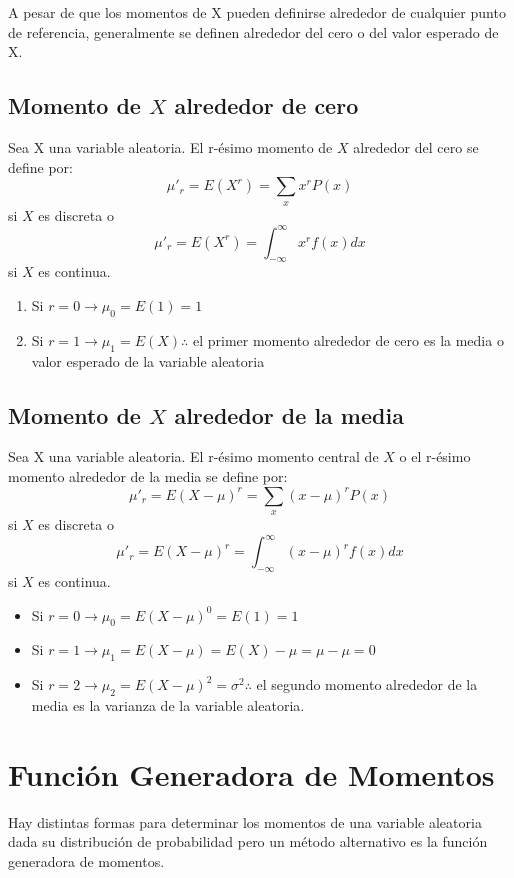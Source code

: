 \documentclass{book}
\begin{document}
A pesar de que los momentos de X pueden definirse alrededor de cualquier punto de referencia, generalmente se definen alrededor del cero o del valor esperado de X. 
 
\subsection{Momento de $X$ alrededor de cero} 
Sea X una variable aleatoria. El r-ésimo momento de $X$ alrededor del cero se define por:
$$\mu'_r = E(X^r)=\underset{x}{\sum}x^rP(x)$$ si $X$ es discreta o $$\mu'_r=E(X^r)=\int_{-\infty}^{\infty}x^rf(x) dx$$ si $X$ es continua.


\begin{enumerate}
    \item Si $r=0 \rightarrow \mu_0= E(1) = 1$
    \item Si $r=1 \rightarrow \mu_1= E(X) \therefore $ el primer momento alrededor de cero es la media o valor esperado de la variable aleatoria
\end{enumerate}

\subsection{Momento de $X$ alrededor de la media} 

Sea X una variable aleatoria. El r-ésimo momento central de $X$ o el r-ésimo momento alrededor de la media se define por:
$$\mu'_r = E(X - \mu)^r=\underset{x}{\sum}(x-\mu)^rP(x)$$ si $X$ es discreta o $$\mu'_r=E(X-\mu)^r=\int_{-\infty}^{\infty}(x-\mu)^rf(x) dx$$ si $X$ es continua.

\begin{itemize}
    \item Si $r=0 \rightarrow \mu_0= E(X-\mu)^0=E(1) = 1$
    \item Si $r=1 \rightarrow \mu_1= E(X-\mu) = E(X)-\mu = \mu - \mu =0$
    \item Si $r=2 \rightarrow \mu_2= E(X-\mu)^2 = \sigma^2 \therefore $ el segundo momento alrededor de la media es la varianza de la variable aleatoria.
\end{itemize}



\section{Función Generadora de Momentos}
Hay distintas formas para determinar los momentos de una variable aleatoria dada su distribución de probabilidad pero un método alternativo es la función generadora de momentos.
\end{document}
